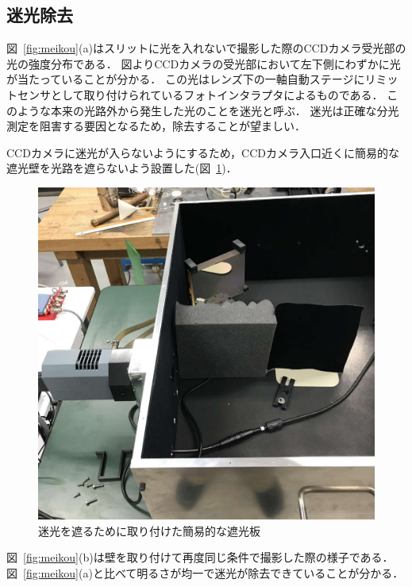 \subsection{迷光除去}
図\ \ref{fig:meikou}(a)はスリットに光を入れないで撮影した際のCCDカメラ受光部の光の強度分布である．
図よりCCDカメラの受光部において左下側にわずかに光が当たっていることが分かる．
この光はレンズ下の一軸自動ステージにリミットセンサとして取り付けられているフォトインタラプタによるものである．
このような本来の光路外から発生した光のことを迷光と呼ぶ．
迷光は正確な分光測定を阻害する要因となるため，除去することが望ましい．

CCDカメラに迷光が入らないようにするため，CCDカメラ入口近くに簡易的な遮光壁を光路を遮らないよう設置した(図\ \ref{fig:syakouban})．
\begin{figure}[htbp]
    \centering
    \includegraphics[scale=0.3]{figure/syakouban_compressed.pdf}
     \caption{迷光を遮るために取り付けた簡易的な遮光板}
     \label{fig:syakouban}
\end{figure}
図\ \ref{fig:meikou}(b)は壁を取り付けて再度同じ条件で撮影した際の様子である．
図\ \ref{fig:meikou}(a)と比べて明るさが均一で迷光が除去できていることが分かる．




